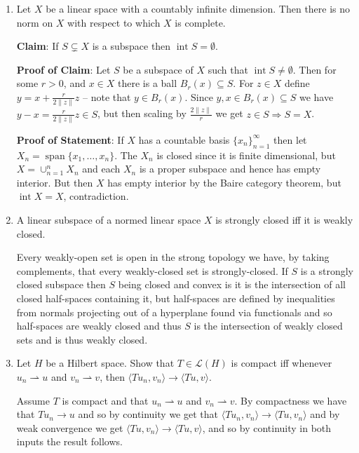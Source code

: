 \documentclass{article}
\newcommand{\weakly}{\rightharpoonup}
\DeclareMathOperator{\Int}{int}
\DeclareMathOperator{\Span}{span}
\begin{document}
\begin{enumerate}
\item Let $X$ be a linear space with a countably infinite dimension. Then there is no norm on $X$ with respect to which $X$ is complete.

{\bf Claim}: If $S \subsetneq X$ is a subspace then $\Int S = \emptyset$.

{\bf Proof of Claim}: Let $S$ be a subspace of $X$ such that $\Int S \neq \emptyset$. Then for some $r > 0$, and $x \in X$ there is a ball $B_r(x) \subseteq S$. For $z \in X$ define $y = x + \frac{r}{2\|z\|}z$ -- note that $y \in B_r(x)$. Since $y, x \in B_r(x) \subseteq S$ we have $y - x = \frac{r}{2\|z\|}z \in S$, but then scaling by $\frac{2\|z\|}{r}$ we get $z \in S \Rightarrow S = X$.

{\bf Proof of Statement}: If $X$ has a countable basis $\{x_n\}_{n=1}^\infty$ then let $X_n = \Span \{x_1, \ldots, x_n\}$. The $X_n$ is closed since it is finite dimensional, but $X = \cup_{n=1}^n X_n$ and each $X_n$ is a proper subspace and hence has empty interior. But then $X$ has empty interior by the Baire category theorem, but $\Int X = X$, contradiction.


\item A linear subspace of a normed linear space $X$ is strongly closed iff it is weakly closed.

Every weakly-open set is open in the strong topology we have, by taking complements, that every weakly-closed set is strongly-closed. If $S$ is a strongly closed subspace then $S$ being closed and convex is it is the intersection of all closed half-spaces containing it, but half-spaces are defined by inequalities from normals projecting out of a hyperplane found via functionals and so half-spaces are weakly closed and thus $S$ is the intersection of weakly closed sets and is thus weakly closed.


\item Let $H$ be a Hilbert space. Show that $T \in \mathcal{L}(H)$ is compact iff whenever $u_n \weakly u$ and $v_n \weakly v$, then $\langle T u_n, v_n \rangle \to \langle T u, v \rangle$.

Assume $T$ is compact and that $u_n \weakly u$ and $v_n \weakly v$. By compactness we have that $T u_n \to u$ and so by continuity we get that $\langle T u_n, v_n \rangle \to \langle T u, v_n \rangle$ and by weak convergence we get $\langle T u, v_n \rangle \to \langle T u, v \rangle$, and so by continuity in both inputs the result follows.


\end{enumerate}
\end{document}
